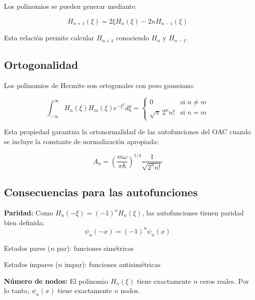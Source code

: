 \documentclass[11pt,a4paper,spanish]{book}
\begin{document}
Los polinomios se pueden generar mediante:

\begin{equation}
	H_{n+1}(\xi) = 2\xi H_n(\xi) - 2n H_{n-1}(\xi)
\end{equation}

Esta relación permite calcular $H_{n+1}$ conociendo $H_n$ y $H_{n-1}$.

\subsection{Ortogonalidad}

Los polinomios de Hermite son ortogonales con peso gaussiano:

\begin{equation}
	\int_{-\infty}^{\infty} H_n(\xi) H_m(\xi) e^{-\xi^2} d\xi = \begin{cases}
		0 & \text{si } n \neq m \\
		\sqrt{\pi} \, 2^n n! & \text{si } n = m
	\end{cases}
\end{equation}

Esta propiedad garantiza la ortonormalidad de las autofunciones del OAC cuando se incluye la constante de normalización apropiada:

\begin{equation}
	A_n = \left(\frac{m\omega}{\pi\hbar}\right)^{1/4} \frac{1}{\sqrt{2^n n!}}
\end{equation}

\subsection{Consecuencias para las autofunciones}

\textbf{Paridad:} Como $H_n(-\xi) = (-1)^n H_n(\xi)$, las autofunciones tienen paridad bien definida:
\begin{equation}
	\psi_n(-x) = (-1)^n \psi_n(x)
\end{equation}

Estados pares ($n$ par): funciones simétricas

Estados impares ($n$ impar): funciones antisimétricas

\textbf{Número de nodos:} El polinomio $H_n(\xi)$ tiene exactamente $n$ ceros reales. Por lo tanto, $\psi_n(x)$ tiene exactamente $n$ nodos.



	
\end{document}
